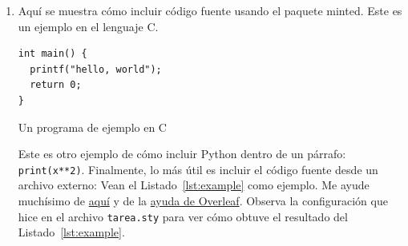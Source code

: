 \begin{enumerate}
\item Aquí se muestra cómo incluir código fuente usando el paquete minted.
Este es un ejemplo en el lenguaje C.
\begin{listing}
\begin{verbatim}
int main() {
  printf("hello, world");
  return 0;
}
\end{verbatim}
\caption{Un programa de ejemplo en C}\label{lst:hello}
\end{listing}

Este es otro ejemplo de cómo incluir Python dentro de un párrafo: \texttt{print(x**2)}.
Finalmente, lo más útil es incluir el código fuente desde un archivo externo: Vean  el Listado~\ref{lst:example} como ejemplo.
Me ayude muchísimo de \href{https://tex.stackexchange.com/questions/252263/alignment-of-minted-line-numbers}{aquí} y de la \href{https://www.overleaf.com/learn/latex/Code_Highlighting_with_minted}{ayuda de Overleaf}.
Observa la configuración que hice en el archivo \verb|tarea.sty| para ver cómo obtuve el resultado del Listado~\ref{lst:example}.


\end{enumerate}
